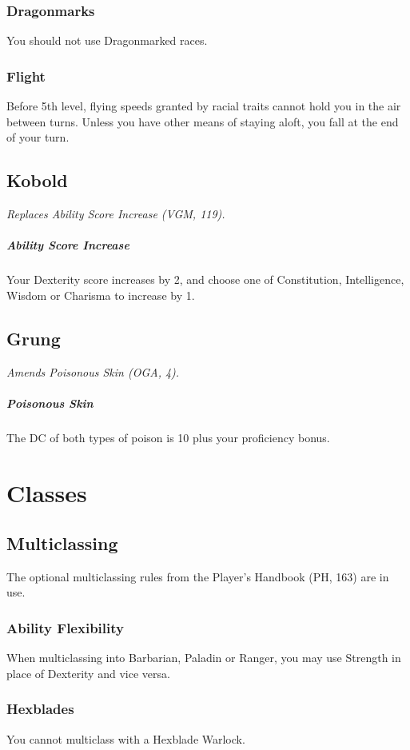 \documentclass[letterpaper,twocolumn,openany,nodeprecatedcode]{dndbook}
\begin{document}
\subsubsection{Dragonmarks} You should not use Dragonmarked races.

\subsubsection{Flight} Before 5th level, flying speeds granted by racial traits cannot hold you in the air between turns. Unless you have other means of staying aloft, you fall at the end of your turn.

\subsection{Kobold}
\textit{Replaces Ability Score Increase (VGM, 119).}

\subparagraph{Ability Score Increase} Your Dexterity score increases by 2, and choose one of Constitution, Intelligence, Wisdom or Charisma to increase by 1.

\subsection{Grung}
\textit{Amends Poisonous Skin (OGA, 4).}

\subparagraph{Poisonous Skin} The DC of both types of poison is 10 plus your proficiency bonus.




\section{Classes}

\subsection{Multiclassing}
The optional multiclassing rules from the Player's Handbook (PH, 163) are in use.

\subsubsection{Ability Flexibility}
When multiclassing into Barbarian, Paladin or Ranger, you may use Strength in place of Dexterity and vice versa.

\subsubsection{Hexblades}
You cannot multiclass with a Hexblade Warlock.
\end{document}
